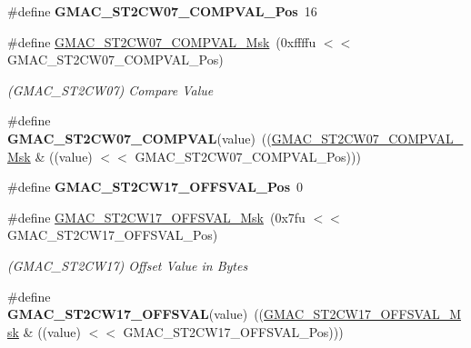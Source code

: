 \begin{DoxyCompactItemize}
\item 
\mbox{\label{group__SAMV71__GMAC_ga63575858b821e5f96b9bb9febdc6f985}} 
\#define {\bfseries G\+M\+A\+C\+\_\+\+S\+T2\+C\+W07\+\_\+\+C\+O\+M\+P\+V\+A\+L\+\_\+\+Pos}~16
\item 
\mbox{\label{group__SAMV71__GMAC_gab5f156a21dbc6f907c6b3be164e1f864}} 
\#define \mbox{\hyperlink{group__SAMV71__GMAC_gab5f156a21dbc6f907c6b3be164e1f864}{G\+M\+A\+C\+\_\+\+S\+T2\+C\+W07\+\_\+\+C\+O\+M\+P\+V\+A\+L\+\_\+\+Msk}}~(0xffffu $<$$<$ G\+M\+A\+C\+\_\+\+S\+T2\+C\+W07\+\_\+\+C\+O\+M\+P\+V\+A\+L\+\_\+\+Pos)
\begin{DoxyCompactList}\small\item\em (G\+M\+A\+C\+\_\+\+S\+T2\+C\+W07) Compare Value \end{DoxyCompactList}\item 
\mbox{\label{group__SAMV71__GMAC_ga73f9a5625c444e22c8cc7b2302bb8069}} 
\#define {\bfseries G\+M\+A\+C\+\_\+\+S\+T2\+C\+W07\+\_\+\+C\+O\+M\+P\+V\+AL}(value)~((\mbox{\hyperlink{group__SAMV71__GMAC_gab5f156a21dbc6f907c6b3be164e1f864}{G\+M\+A\+C\+\_\+\+S\+T2\+C\+W07\+\_\+\+C\+O\+M\+P\+V\+A\+L\+\_\+\+Msk}} \& ((value) $<$$<$ G\+M\+A\+C\+\_\+\+S\+T2\+C\+W07\+\_\+\+C\+O\+M\+P\+V\+A\+L\+\_\+\+Pos)))
\item 
\mbox{\label{group__SAMV71__GMAC_gaa9d3c1e1d68cd3e32c318acb1d939f6d}} 
\#define {\bfseries G\+M\+A\+C\+\_\+\+S\+T2\+C\+W17\+\_\+\+O\+F\+F\+S\+V\+A\+L\+\_\+\+Pos}~0
\item 
\mbox{\label{group__SAMV71__GMAC_ga97157436e4b56095515dca0135630967}} 
\#define \mbox{\hyperlink{group__SAMV71__GMAC_ga97157436e4b56095515dca0135630967}{G\+M\+A\+C\+\_\+\+S\+T2\+C\+W17\+\_\+\+O\+F\+F\+S\+V\+A\+L\+\_\+\+Msk}}~(0x7fu $<$$<$ G\+M\+A\+C\+\_\+\+S\+T2\+C\+W17\+\_\+\+O\+F\+F\+S\+V\+A\+L\+\_\+\+Pos)
\begin{DoxyCompactList}\small\item\em (G\+M\+A\+C\+\_\+\+S\+T2\+C\+W17) Offset Value in Bytes \end{DoxyCompactList}\item 
\mbox{\label{group__SAMV71__GMAC_ga6993c26320557a64367bf8addfe1a704}} 
\#define {\bfseries G\+M\+A\+C\+\_\+\+S\+T2\+C\+W17\+\_\+\+O\+F\+F\+S\+V\+AL}(value)~((\mbox{\hyperlink{group__SAMV71__GMAC_ga97157436e4b56095515dca0135630967}{G\+M\+A\+C\+\_\+\+S\+T2\+C\+W17\+\_\+\+O\+F\+F\+S\+V\+A\+L\+\_\+\+Msk}} \& ((value) $<$$<$ G\+M\+A\+C\+\_\+\+S\+T2\+C\+W17\+\_\+\+O\+F\+F\+S\+V\+A\+L\+\_\+\+Pos)))

\end{DoxyCompactItemize}
